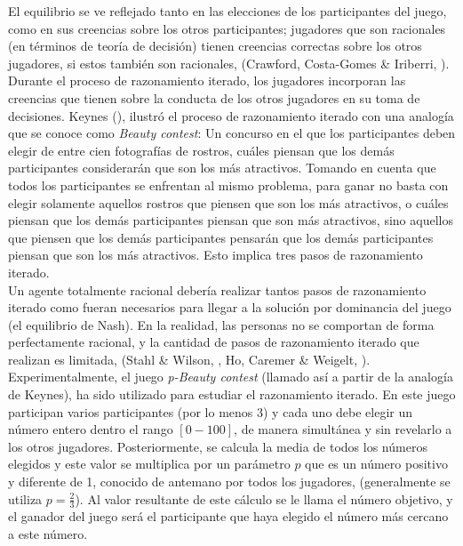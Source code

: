 El equilibrio se ve reflejado tanto en las elecciones de los participantes del juego, como en sus creencias sobre los otros participantes; jugadores que son racionales (en términos de teoría de decisión) tienen creencias correctas sobre los otros jugadores, si estos también son racionales, (Crawford, Costa-Gomes & Iriberri, \citeyear{Crawford}).\\

Durante el proceso de razonamiento iterado, los jugadores incorporan las creencias que tienen sobre la conducta de los otros jugadores en su toma de decisiones. Keynes (\citeyear{Keynes}), ilustró el proceso de razonamiento iterado con una analogía que se conoce como \textit{Beauty contest}: Un concurso en el que los participantes deben elegir de entre cien fotografías de rostros, cuáles piensan que los demás participantes considerarán que son los más atractivos. Tomando en cuenta que todos los participantes se enfrentan al mismo problema, para ganar no basta con elegir solamente aquellos rostros que piensen que son los más atractivos, o cuáles piensan que los demás participantes piensan que son más atractivos, sino aquellos que piensen que los demás participantes pensarán que los demás participantes piensan que son los más atractivos. Esto implica tres pasos de razonamiento iterado.\\

Un agente totalmente racional debería realizar tantos pasos de razonamiento iterado como fueran necesarios para llegar a la solución por dominancia del juego (el equilibrio de Nash). En la realidad, las personas no se comportan de forma perfectamente racional, y la cantidad de pasos de razonamiento iterado que realizan es limitada, (Stahl & Wilson, \citeyear{Stahl}, Ho, Caremer & Weigelt, \citeyear{Ho}).\\

Experimentalmente, el juego \textit{p-Beauty contest} (llamado así a partir de la analogía de Keynes), ha sido utilizado para estudiar el razonamiento iterado. En este juego participan varios participantes (por lo menos 3) y cada uno debe elegir un número entero dentro el rango $[0 - 100]$, de manera simultánea y sin revelarlo a los otros jugadores. Posteriormente, se calcula la media de todos los números elegidos y este valor se multiplica por un parámetro $p$ que es un número positivo y diferente de 1, conocido de antemano por todos los jugadores, (generalmente se utiliza $p = \frac{2}{3}$). Al valor resultante de este cálculo se le llama el número objetivo, y el ganador del juego será el participante que haya elegido el número más cercano a este número.\\

